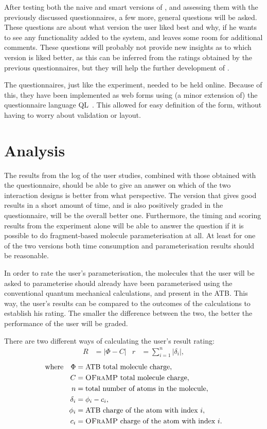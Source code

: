 After testing both the naive and smart versions of \oframp, and assessing them with the previously discussed questionnaires, a few more, general questions will be asked. These questions are about what version the user liked best and why, if he wants to see any functionality added to the system, and leaves some room for additional comments. These questions will probably not provide new insights as to which version is liked better, as this can be inferred from the ratings obtained by the previous questionnaires, but they will help the further development of \oframp.

The questionnaires, just like the experiment, needed to be held online. Because of this, they have been implemented as web forms using (a minor extension of) the questionnaire language QL~\cite{erdweg2013state}. This allowed for easy definition of the form, without having to worry about validation or layout.



\section{Analysis}
The results from the log of the user studies, combined with those obtained with the questionnaire, should be able to give an answer on which of the two interaction designs is better from what perspective. The version that gives good results in a short amount of time, and is also positively graded in the questionnaire, will be the overall better one. Furthermore, the timing and scoring results from the experiment alone will be able to answer the question if it is possible to do fragment-based molecule parameterisation at all. At least for one of the two versions both time consumption and parameterisation results should be reasonable.

In order to rate the user's parameterisation, the molecules that the user will be asked to parameterise should already have been parameterised using the conventional quantum mechanical calculations, and present in the ATB. This way, the user's results can be compared to the outcomes of the calculations to establish his rating. The smaller the difference between the two, the better the performance of the user will be graded.

There are two different ways of calculating the user's result rating:
\begin{align*}
R &= |\Phi - C| & r &= \sum_{i = 1}^{n} |\delta_{i}|,
\end{align*}
\vspace{-1em}
\begin{align*}
\text{where} \quad \Phi &= \text{ATB total molecule charge},\\
C &= \text{\textsc{OFraMP}{} total molecule charge},\\
n &= \text{total number of atoms in the molecule},\\
\delta_{i} &= \phi_{i} - c_{i},\\
\phi_{i} &= \text{ATB charge of the atom with index}~i,\\
c_{i} &= \text{\textsc{OFraMP}{} charge of the atom with index}~i.
\end{align*}

